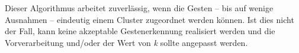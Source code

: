 Dieser Algorithmus arbeitet zuverlässig, wenn die Gesten -- bis auf wenige Ausnahmen -- eindeutig einem Cluster zugeordnet werden können. Ist dies nicht der Fall, kann keine akzeptable Gestenerkennung realisiert werden und die Vorverarbeitung und/oder der Wert von \emph{k} sollte angepasst werden.









